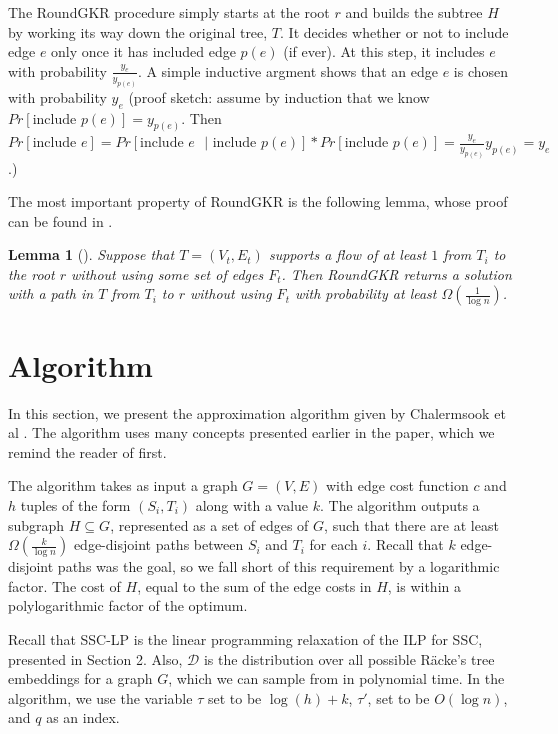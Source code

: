 \documentclass[12pt]{article}
\newtheorem{lemma}{Lemma}
\begin{document}
The RoundGKR procedure simply starts at the root $r$ and builds the subtree $H$ by working its way down the original tree, $T$. It decides whether or not to include edge $e$ only once it has included edge $p(e)$ (if ever). At this step, it includes $e$ with probability $\frac{y_e}{y_{p(e)}}$. A simple inductive argment shows that an edge $e$ is chosen with probability $y_e$ (proof sketch: assume by induction that we know $Pr[\text{include $p(e)$}] = y_{p(e)}$. Then $Pr[\text{include $e$}] = Pr[\text{include $e$ $|$ include $p(e)$}]*Pr[\text{include $p(e)$}] = \frac{y_e}{y_{p(e)}}y_{p(e)} = y_e$.)

The most important property of RoundGKR is the following lemma, whose proof can be found in \cite{GKR}.

\begin{lemma}[\cite{GKR}]
\label{lem:findpath}
Suppose that $T = (V_t, E_t)$ supports a flow of at least $1$ from $T_i$ to the root $r$ without using some set of edges $F_t$. Then RoundGKR returns a solution with a path in $T$ from $T_i$ to $r$ without using $F_t$ with probability at least $\Omega(\frac{1}{\log n})$. 
\end{lemma}
%

\section{Algorithm}

In this section, we present the approximation algorithm given by Chalermsook et al \cite{ssc}. The algorithm uses many concepts presented earlier in the paper, which we remind the reader of first.

The algorithm takes as input a graph $G = (V,E)$ with edge cost function $c$ and $h$ tuples of the form $(S_i,T_i)$ along with a value $k$. The algorithm outputs a subgraph $H \subseteq G$, represented as a set of edges of $G$, such that there are at least $\Omega(\frac{k}{\log n})$ edge-disjoint paths between $S_i$ and $T_i$ for each $i$. Recall that $k$ edge-disjoint paths was the goal, so we fall short of this requirement by a logarithmic factor. The cost of $H$, equal to the sum of the edge costs in $H$, is within a polylogarithmic factor of the optimum. 

Recall that SSC-LP is the linear programming relaxation of the ILP for SSC, presented in Section 2. Also, $\mathcal{D}$ is the distribution over all possible R\"{a}cke's tree embeddings for a graph $G$, which we can sample from in polynomial time. In the algorithm, we use the variable $\tau$ set to be $\log(h)+k$, $\tau'$, set to be $O(\log n)$, and $q$ as an index.
\end{document}

